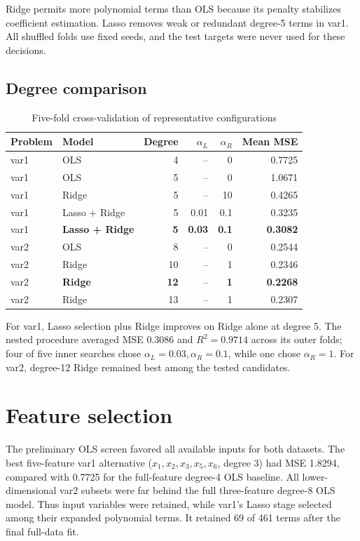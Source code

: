 \documentclass[10pt,a4paper]{article}
\begin{document}
Ridge permits more polynomial terms than OLS because its penalty stabilizes coefficient estimation. Lasso removes weak or redundant degree-5 terms in var1. All shuffled folds use fixed seeds, and the test targets were never used for these decisions.

\subsection{Degree comparison}

\begin{table}[h]
\centering
\caption{Five-fold cross-validation of representative configurations}
\begin{tabular}{llrrrr}
\toprule
Problem & Model & Degree & $\alpha_L$ & $\alpha_R$ & Mean MSE \\
\midrule
var1 & OLS & 4 & -- & 0 & 0.7725 \\
var1 & OLS & 5 & -- & 0 & 1.0671 \\
var1 & Ridge & 5 & -- & 10 & 0.4265 \\
var1 & Lasso + Ridge & 5 & 0.01 & 0.1 & 0.3235 \\
var1 & \textbf{Lasso + Ridge} & \textbf{5} & \textbf{0.03} & \textbf{0.1} & \textbf{0.3082} \\
\midrule
var2 & OLS & 8 & -- & 0 & 0.2544 \\
var2 & Ridge & 10 & -- & 1 & 0.2346 \\
var2 & \textbf{Ridge} & \textbf{12} & -- & \textbf{1} & \textbf{0.2268} \\
var2 & Ridge & 13 & -- & 1 & 0.2307 \\
\bottomrule
\end{tabular}
\end{table}

For var1, Lasso selection plus Ridge improves on Ridge alone at degree 5. The nested procedure averaged MSE 0.3086 and $R^2=0.9714$ across its outer folds; four of five inner searches chose $\alpha_L=0.03,\alpha_R=0.1$, while one chose $\alpha_R=1$. For var2, degree-12 Ridge remained best among the tested candidates.

\section{Feature selection}
The preliminary OLS screen favored all available inputs for both datasets. The best five-feature var1 alternative ($x_1,x_2,x_3,x_5,x_6$, degree 3) had MSE 1.8294, compared with 0.7725 for the full-feature degree-4 OLS baseline. All lower-dimensional var2 subsets were far behind the full three-feature degree-8 OLS model. Thus input variables were retained, while var1's Lasso stage selected among their expanded polynomial terms. It retained 69 of 461 terms after the final full-data fit.
\end{document}
